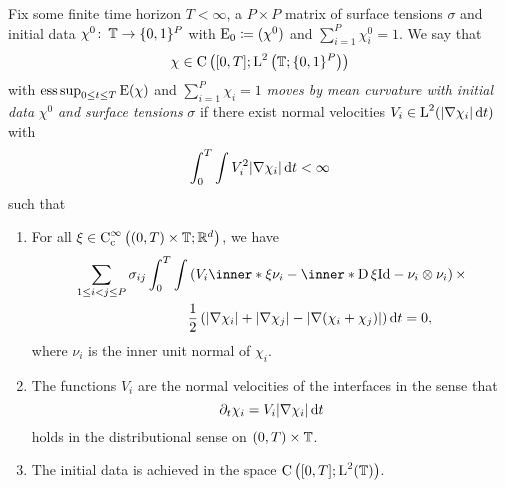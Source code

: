 \begin{definition}
	\label{motion_by_mmcf}
	Fix some finite time horizon $ T < \infty $, a $ P \times P $ matrix of 
	surface tensions $ \sigma $ and initial data $ \chi^{ 0 } \colon \operatorname{\mathbb{T}} 
	\to \{ 0 , 1 \}^{ P } $ with $ \operatorname{E}_{ 0 } \coloneqq ( \chi^{ 0 } ) $ and 
	$ \sum_{ i = 1 }^{ P } \chi_{ i }^{ 0 } = 1 $. We say that
	\begin{equation*}
		\chi \in \operatorname{C} \left(
		[ 0 , T ]
		;
		\operatorname{L}^{ 2 } \left( \operatorname{\mathbb{T}} ; \{ 0 , 1 \}^{ P } \right)
		\right)
	\end{equation*}
	with $ \operatorname*{ess\,sup}_{ 0 \leq t \leq T } \operatorname{E} ( \chi ) $ and $ \sum_{ i = 1 
	}^{ P } \chi_{ i } = 1 $ \emph{moves by mean curvature with initial data} $ 
	\chi^{ 0 } $ \emph{and surface tensions} $ \sigma $ if there exist normal 
	velocities $ V_{ i } \in \operatorname{L}^{ 2 } ( \abs{ \nabla \chi_{ i } } \dd{ t } ) $ 
	with
	\begin{equation*}
		\int_{ 0 }^{ T }
		\int
		V_{ i }^{ 2 }
		\abs{ \nabla \chi_{ i } }
		\dd{ t }
		< \infty 
	\end{equation*} 
	such that
	\begin{enumerate}
		\item For all 
		$ \xi \in \operatorname{C}_{ \mathrm{c} }^{ \infty } \left(
		( 0 , T ) \times \operatorname{\mathbb{T}} ; \mathbb{ R }^{ d }
		\right)
		$, we have 
		\begin{align}
			\label{distributional_equation_mmcf}
			\sum_{ 1 \leq i < j \leq P }
			\sigma_{ i j }
			\int_{ 0 }^{ T }
			\int
			&
			\left(
			V_{ i } \inner*{ \xi }{ \nu_{ i } }
			-
			\inner*{ \diff \xi }{ \mathrm{Id} - \nu_{ i } \otimes \nu_{ i } }
			\right)
			\times
			\\
			\notag
			& \frac{1}{ 2 }
			\left(
			\abs{ \nabla \chi_{ i } }
			+
			\abs{ \nabla \chi_{ j } }
			-
			\abs{ \nabla ( \chi_{ i } + \chi_{ j } ) }
			\right)
			\dd{ t }
			=0,			
		\end{align}
		where $ \nu_{ i } $ is the inner unit normal of $ \chi_{ i } $.
		
		\item 
		The functions $ V_{ i } $ are the normal velocities of the interfaces 
		in the sense that
		\begin{equation*}
			\partial_{ t } \chi_{ i }
			=
			V_{ i } \abs{ \nabla \chi_{ i } } \dd{ t }
		\end{equation*}
		holds in the distributional sense on $ ( 0 , T ) \times \operatorname{\mathbb{T}} $.
		
		\item
		The initial data is achieved in the space $ \operatorname{C} \left( [ 0 , T ] ; 
		\operatorname{L}^{ 2 } ( \operatorname{\mathbb{T}} ) \right) $.
	\end{enumerate}
\end{definition}

